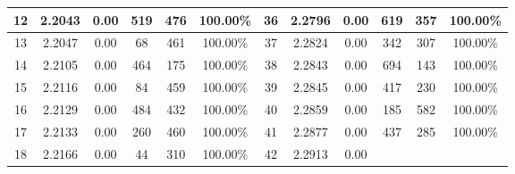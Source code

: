 \begin{table}[htbp]
\begin{minipage}[b]{0.45\linewidth}
{\begin{tabular}{cccccccccccc}
\multicolumn{1}{c|}{12} &
  \multicolumn{1}{c|}{2.2043} &
  \multicolumn{1}{c|}{0.00} &
  \multicolumn{1}{c|}{519} &
  \multicolumn{1}{c|}{476} &
  \multicolumn{1}{c|}{100.00\%} &
  \multicolumn{1}{c|}{36} &
  \multicolumn{1}{c|}{2.2796} &
  \multicolumn{1}{c|}{0.00} &
  \multicolumn{1}{c|}{619} &
  \multicolumn{1}{c|}{357} &
  100.00\% \\ \hline
\multicolumn{1}{c|}{13} &
  \multicolumn{1}{c|}{2.2047} &
  \multicolumn{1}{c|}{0.00} &
  \multicolumn{1}{c|}{68} &
  \multicolumn{1}{c|}{461} &
  \multicolumn{1}{c|}{100.00\%} &
  \multicolumn{1}{c|}{37} &
  \multicolumn{1}{c|}{2.2824} &
  \multicolumn{1}{c|}{0.00} &
  \multicolumn{1}{c|}{342} &
  \multicolumn{1}{c|}{307} &
  100.00\% \\ \hline
\multicolumn{1}{c|}{14} &
  \multicolumn{1}{c|}{2.2105} &
  \multicolumn{1}{c|}{0.00} &
  \multicolumn{1}{c|}{464} &
  \multicolumn{1}{c|}{175} &
  \multicolumn{1}{c|}{100.00\%} &
  \multicolumn{1}{c|}{38} &
  \multicolumn{1}{c|}{2.2843} &
  \multicolumn{1}{c|}{0.00} &
  \multicolumn{1}{c|}{694} &
  \multicolumn{1}{c|}{143} &
  100.00\% \\ \hline
\multicolumn{1}{c|}{15} &
  \multicolumn{1}{c|}{2.2116} &
  \multicolumn{1}{c|}{0.00} &
  \multicolumn{1}{c|}{84} &
  \multicolumn{1}{c|}{459} &
  \multicolumn{1}{c|}{100.00\%} &
  \multicolumn{1}{c|}{39} &
  \multicolumn{1}{c|}{2.2845} &
  \multicolumn{1}{c|}{0.00} &
  \multicolumn{1}{c|}{417} &
  \multicolumn{1}{c|}{230} &
  100.00\% \\ \hline
\multicolumn{1}{c|}{16} &
  \multicolumn{1}{c|}{2.2129} &
  \multicolumn{1}{c|}{0.00} &
  \multicolumn{1}{c|}{484} &
  \multicolumn{1}{c|}{432} &
  \multicolumn{1}{c|}{100.00\%} &
  \multicolumn{1}{c|}{40} &
  \multicolumn{1}{c|}{2.2859} &
  \multicolumn{1}{c|}{0.00} &
  \multicolumn{1}{c|}{185} &
  \multicolumn{1}{c|}{582} &
  100.00\% \\ \hline
\multicolumn{1}{c|}{17} &
  \multicolumn{1}{c|}{2.2133} &
  \multicolumn{1}{c|}{0.00} &
  \multicolumn{1}{c|}{260} &
  \multicolumn{1}{c|}{460} &
  \multicolumn{1}{c|}{100.00\%} &
  \multicolumn{1}{c|}{41} &
  \multicolumn{1}{c|}{2.2877} &
  \multicolumn{1}{c|}{0.00} &
  \multicolumn{1}{c|}{437} &
  \multicolumn{1}{c|}{285} &
  100.00\% \\ \hline
\multicolumn{1}{c|}{18} &
  \multicolumn{1}{c|}{2.2166} &
  \multicolumn{1}{c|}{0.00} &
  \multicolumn{1}{c|}{44} &
  \multicolumn{1}{c|}{310} &
  \multicolumn{1}{c|}{100.00\%} &
  \multicolumn{1}{c|}{42} &
  \multicolumn{1}{c|}{2.2913} &
  \multicolumn{1}{c|}{0.00} &

\end{tabular}}
\end{minipage}
\end{table}
